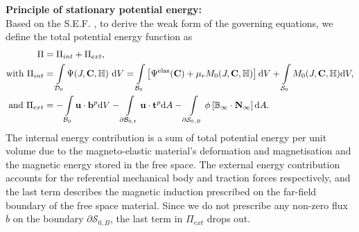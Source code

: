 \noindent \textbf{Principle of stationary potential energy:} \\
Based on the S.E.F. , to derive the weak form of the governing equations, we define the total potential energy function as
\begin{align}
\Pi &= \Pi_{int} + \Pi_{ext}, \\
\text{with} \ \Pi_{int} &= \int\limits_{\mathcal{D}_0} \Psi (J, \mathbf{C}, \mathbb{H}) \ \mathrm{d}V = \int\limits_{\mathcal{B}_0} \large\left[ \Psi^{\text{elas}} (\mathbf{C}) + \mu_r M_0 (J, \mathbf{C}, \mathbb{H}) \large\right] \mathrm{d}V + \int\limits_{\mathcal{S}_0} M_0 (J, \mathbf{C}, \mathbb{H}) \mathrm{d}V, \label{eq:3.24.1}\\
\text{and} \ \Pi_{ext} &= -\int\limits_{\mathcal{B}_0} \mathbf{u} \cdot \mathbf{b}^p \mathrm{d} V - \int\limits_{\partial \mathcal{B}_{0,t}} \mathbf{u} \cdot \mathbf{t}^p \mathrm{d}A -\int\limits_{\partial \mathcal{S}_{0,B}} \phi \left[ \mathbb{B}_{\infty} \cdot \mathbf{N}_{\infty} \right] \mathrm{d}A.  
\label{eq:3.24.2}
\end{align}
The internal energy contribution  is a sum of total potential energy per unit volume due to the magneto-elastic material's deformation and magnetisation and the magnetic energy stored in the free space. The external energy contribution  accounts for the referential mechanical body and traction forces respectively, and the last term describes the magnetic induction prescribed on the far-field boundary of the free space material. Since we do not prescribe any non-zero flux $\overline{b}$ on the boundary $\partial \mathcal{S}_{0,B}$, the last term in $\Pi_{ext}$ drops out. \par 

